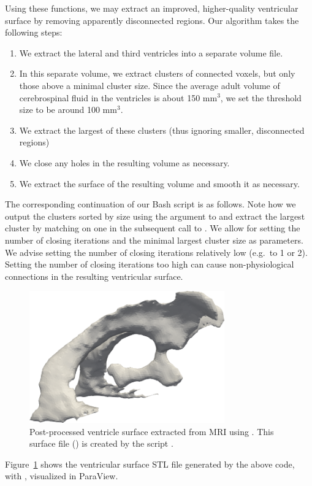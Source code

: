 Using these functions, we may extract an improved, higher-quality
ventricular surface by removing apparently disconnected regions. Our
algorithm takes the following steps:
\begin{enumerate}
\item
  We extract the lateral and third ventricles into a separate volume
  file.
\item
  In this separate volume, we extract clusters of connected voxels,
  but only those above a minimal cluster size. Since the average adult
  volume of cerebrospinal fluid in the ventricles is about 150
  mm$^{3}$, we set the threshold size to be around 100 mm$^3$.
\item
  We extract the largest of these clusters (thus ignoring smaller,
  disconnected regions)
\item
  We close any holes in the resulting volume as necessary.
\item
  We extract the surface of the resulting volume and smooth it as
  necessary.
\end{enumerate}
The corresponding continuation of our Bash script is as follows. Note
how we output the clusters sorted by size using the argument
 to  and extract the largest
cluster by matching on one in the subsequent call to
. We allow for setting the number of closing
iterations  and the minimal largest cluster size
 as parameters. We advise setting the number of closing
iterations relatively low (e.g.~to 1 or 2). Setting the number of closing
iterations too high can cause non-physiological connections in the
resulting ventricular surface.


\begin{figure}
  \centering
  \includegraphics[width=0.75\textwidth]{./graphics/chp4/ernie-ventricles-final-r.png}
  \caption{Post-processed ventricle surface extracted from MRI using
    \freesurfer{}. This surface file () is
    created by the script .}
  \label{fig:chp4:ernie-ventricles-final}
\end{figure}
\noindent Figure~\ref{fig:chp4:ernie-ventricles-final} shows the ventricular
surface STL file generated by the above code, with , 
visualized in ParaView. 

